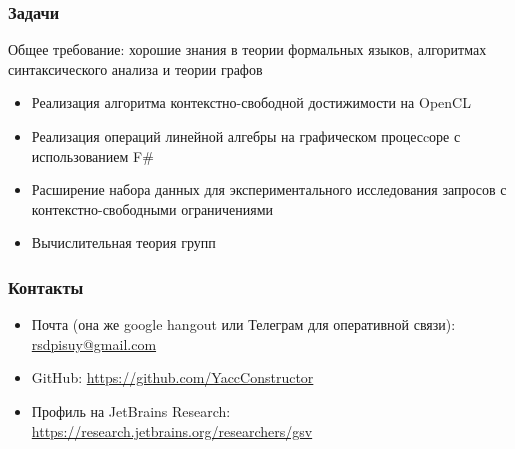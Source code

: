 \documentclass{beamer}
\begin{document}
\begin{frame}[fragile]
\frametitle{Задачи}
  Общее требование: хорошие знания в теории формальных языков, алгоритмах синтаксического анализа и теории графов
  \begin{itemize}
    \item Реализация алгоритма контекстно-свободной достижимости на OpenCL
    \item Реализация операций линейной алгебры на графическом процесcоре с использованием F\# 
    \item Расширение набора данных для экспериментального исследования запросов с контекстно-свободными ограничениями
    \item Вычислительная теория групп
  \end{itemize}
\end{frame}


\begin{frame}
\frametitle{Контакты}
\begin{itemize}
  \item Почта (она же google hangout или Телеграм для оперативной связи): \url{rsdpisuy@gmail.com}
  \item GitHub: \url{https://github.com/YaccConstructor}
  \item Профиль на JetBrains Research: \url{https://research.jetbrains.org/researchers/gsv}
\end{itemize}
\end{frame}
\end{document}
